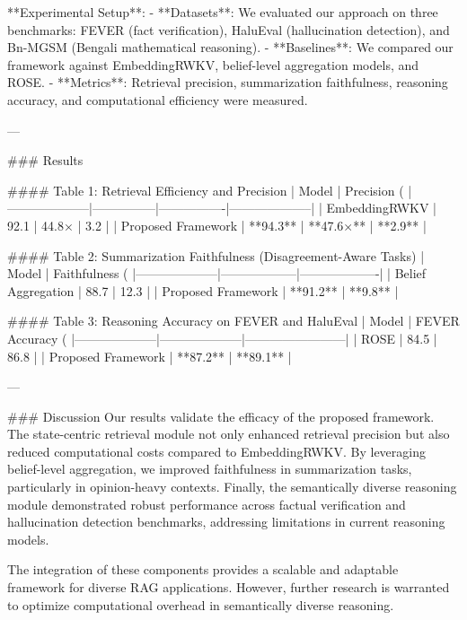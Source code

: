 **Experimental Setup**:  
- **Datasets**: We evaluated our approach on three benchmarks: FEVER (fact verification), HaluEval (hallucination detection), and Bn-MGSM (Bengali mathematical reasoning).  
- **Baselines**: We compared our framework against EmbeddingRWKV, belief-level aggregation models, and ROSE.  
- **Metrics**: Retrieval precision, summarization faithfulness, reasoning accuracy, and computational efficiency were measured.  

---

### Results  

#### Table 1: Retrieval Efficiency and Precision  
| Model              | Precision (%
|--------------------|---------------|----------------|--------------------|  
| EmbeddingRWKV      | 92.1          | 44.8×          | 3.2                |  
| Proposed Framework | **94.3**      | **47.6×**      | **2.9**            |  

#### Table 2: Summarization Faithfulness (Disagreement-Aware Tasks)  
| Model              | Faithfulness (%
|--------------------|------------------|-------------------|  
| Belief Aggregation | 88.7             | 12.3              |  
| Proposed Framework | **91.2**         | **9.8**           |  

#### Table 3: Reasoning Accuracy on FEVER and HaluEval  
| Model              | FEVER Accuracy (%
|--------------------|--------------------|------------------------|  
| ROSE               | 84.5               | 86.8                  |  
| Proposed Framework | **87.2**           | **89.1**              |  

---

### Discussion  
Our results validate the efficacy of the proposed framework. The state-centric retrieval module not only enhanced retrieval precision but also reduced computational costs compared to EmbeddingRWKV. By leveraging belief-level aggregation, we improved faithfulness in summarization tasks, particularly in opinion-heavy contexts. Finally, the semantically diverse reasoning module demonstrated robust performance across factual verification and hallucination detection benchmarks, addressing limitations in current reasoning models.  

The integration of these components provides a scalable and adaptable framework for diverse RAG applications. However, further research is warranted to optimize computational overhead in semantically diverse reasoning.  

